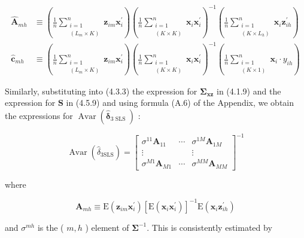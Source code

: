 \documentclass[10pt]{article}
\begin{document}
\begin{align*}
\widehat{\mathbf{A}}_{m h} & \equiv\left(\frac{1}{n} \sum_{\substack{i=1 \\
\left(L_{m} \times K\right)}}^{n} \mathbf{z}_{i m} \mathbf{x}_{i}^{\prime}\right)\left(\frac{1}{n} \sum_{\substack{i=1 \\
(K \times K)}}^{n} \mathbf{x}_{i} \mathbf{x}_{i}^{\prime}\right)^{-1}\left(\frac{1}{n} \sum_{\substack{i=1 \\
\left(K \times L_{h}\right)}}^{n} \mathbf{x}_{i} \mathbf{z}_{i h}^{\prime}\right)  \tag{4.5.13}\\
\hat{\mathbf{c}}_{m h} & \equiv\left(\frac{1}{n} \sum_{\substack{i=1 \\
\left(L_{m} \times K\right)}}^{n} \mathbf{z}_{i m} \mathbf{x}_{i}^{\prime}\right)\left(\frac{1}{n} \sum_{\substack{i=1 \\
(K \times K)}}^{n} \mathbf{x}_{i} \mathbf{x}_{i}^{\prime}\right)^{-1}\left(\frac{1}{n} \sum_{\substack{i=1 \\
(K \times 1)}}^{n} \mathbf{x}_{i} \cdot y_{i h}\right) \tag{4.5.14}
\end{align*}


Similarly, substituting into (4.3.3) the expression for $\boldsymbol{\Sigma}_{\mathbf{x z}}$ in (4.1.9) and the expression for $\mathbf{S}$ in (4.5.9) and using formula (A.6) of the Appendix, we obtain the expressions for $\operatorname{Avar}\left(\hat{\boldsymbol{\delta}}_{3 \text { SLS }}\right)$ :

\[
\operatorname{Avar}\left(\hat{\delta}_{3 \mathrm{SLS}}\right)=\left[\begin{array}{ccc}
\sigma^{11} \mathbf{A}_{11} & \cdots & \sigma^{1 M} \mathbf{A}_{1 M}  \tag{4.5.15}\\
\vdots & & \vdots \\
\sigma^{M 1} \mathbf{A}_{M 1} & \cdots & \sigma^{M M} \mathbf{A}_{M M}
\end{array}\right]^{-1}
\]

where


\begin{equation*}
\mathbf{A}_{m h} \equiv \mathrm{E}\left(\mathbf{z}_{i m} \mathbf{x}_{i}^{\prime}\right)\left[\mathrm{E}\left(\mathbf{x}_{i} \mathbf{x}_{i}^{\prime}\right)\right]^{-1} \mathrm{E}\left(\mathbf{x}_{i} \mathbf{z}_{i h}^{\prime}\right) \tag{4.5.16}
\end{equation*}


and $\sigma^{m h}$ is the ( $m, h$ ) element of $\boldsymbol{\Sigma}^{-1}$. This is consistently estimated by
\end{document}

